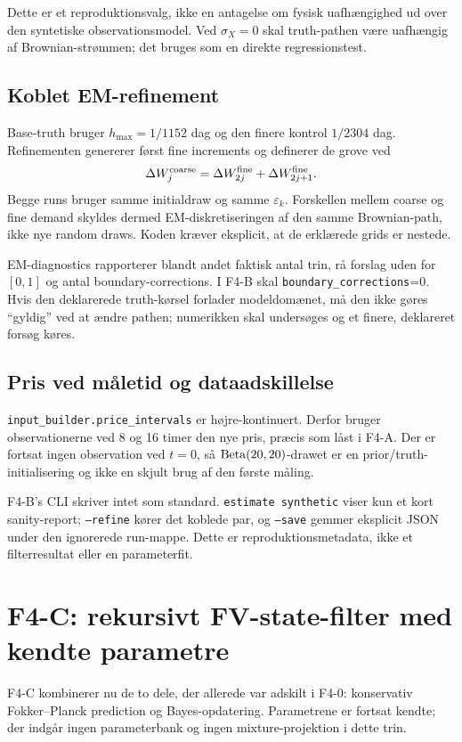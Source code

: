 Dette er et reproduktionsvalg, ikke en antagelse om fysisk uafhængighed ud over den
syntetiske observationsmodel. Ved \(\sigma_X=0\) skal truth-pathen være uafhængig af
Brownian-strømmen; det bruges som en direkte regressionstest.

\subsection{Koblet EM-refinement}
Base-truth bruger \(h_{\max}=1/1152\) dag og den finere kontrol \(1/2304\) dag.
Refinementen genererer først fine increments og definerer de grove ved
\begin{equation}
 \Delta W_j^{\rm coarse}
 =\Delta W_{2j}^{\rm fine}+\Delta W_{2j+1}^{\rm fine}.
 \label{eq:f4b_coupling}
\end{equation}
Begge runs bruger samme initialdraw og samme \(\varepsilon_k\). Forskellen mellem
coarse og fine demand skyldes dermed EM-diskretiseringen af den samme Brownian-path,
ikke nye random draws. Koden kræver eksplicit, at de erklærede grids er nestede.

EM-diagnostics rapporterer blandt andet faktisk antal trin, rå forslag uden for
\([0,1]\) og antal boundary-corrections. I F4-B skal \texttt{boundary\_corrections}=0.
Hvis den deklarerede truth-kørsel forlader modeldomænet, må den ikke gøres ``gyldig''
ved at ændre pathen; numerikken skal undersøges og et finere, deklareret forsøg køres.

\subsection{Pris ved måletid og dataadskillelse}
\texttt{input\_builder.price\_intervals} er højre-kontinuert. Derfor bruger
observationerne ved 8 og 16 timer den nye pris, præcis som låst i F4-A. Der er fortsat
ingen observation ved \(t=0\), så \(\operatorname{Beta}(20,20)\)-drawet er en prior/truth-initialisering
og ikke en skjult brug af den første måling.

F4-B's CLI skriver intet som standard. \texttt{estimate synthetic} viser kun et kort
sanity-report; \texttt{--refine} kører det koblede par, og \texttt{--save} gemmer
eksplicit JSON under den ignorerede run-mappe. Dette er reproduktionsmetadata, ikke
et filterresultat eller en parameterfit.

\section{F4-C: rekursivt FV-state-filter med kendte parametre}
\label{sec:f4c}
F4-C kombinerer nu de to dele, der allerede var adskilt i F4-0: konservativ
Fokker--Planck prediction og Bayes-opdatering. Parametrene er fortsat kendte;
der indgår ingen parameterbank og ingen mixture-projektion i dette trin.

